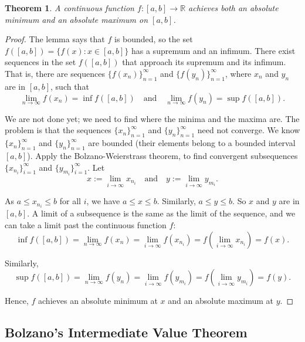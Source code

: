 \documentclass{article}
\newtheorem{theorem}{Theorem}[section]
\theoremstyle{definition}
\begin{document}
\begin{theorem}
    A continuous function \( f: [a, b] \rightarrow \mathbb{R} \) achieves both an absolute minimum and an absolute maximum on \([a, b]\).
\end{theorem}

\begin{proof}
    The lemma says that \( f \) is bounded, so the set \( f([a, b]) = \{ f(x) : x \in [a, b] \} \) has a supremum and an infimum. There exist sequences in the set \( f([a, b]) \) that approach its supremum and its infimum. That is, there are sequences \( \{ f(x_n) \}_{n=1}^{\infty} \) and \( \{ f(y_n) \}_{n=1}^{\infty} \), where \( x_n \) and \( y_n \) are in \( [a, b] \), such that
\[
\lim_{n \rightarrow \infty} f(x_n) = \inf f([a, b]) \quad \text{and} \quad \lim_{n \rightarrow \infty} f(y_n) = \sup f([a, b]).
\]

We are not done yet; we need to find where the minima and the maxima are. The problem is that the sequences \( \{ x_n \}_{n=1}^{\infty} \) and \( \{ y_n \}_{n=1}^{\infty} \) need not converge. We know \( \{ x_n \}_{n=1}^{\infty} \) and \( \{ y_n \}_{n=1}^{\infty} \) are bounded (their elements belong to a bounded interval \( [a, b] \)). Apply the Bolzano-Weierstrass theorem, to find convergent subsequences \( \{ x_{n_i} \}_{i=1}^{\infty} \) and \( \{ y_{m_i} \}_{i=1}^{\infty} \). Let
\[
x := \lim_{i \rightarrow \infty} x_{n_i} \quad \text{and} \quad y := \lim_{i \rightarrow \infty} y_{m_i}.
\]

As \( a \leq x_{n_i} \leq b \) for all \( i \), we have \( a \leq x \leq b \). Similarly, \( a \leq y \leq b \). So \( x \) and \( y \) are in \( [a, b] \). A limit of a subsequence is the same as the limit of the sequence, and we can take a limit past the continuous function \( f \):
\[
\inf f([a, b]) = \lim_{n \rightarrow \infty} f(x_n) = \lim_{i \rightarrow \infty} f(x_{n_i}) = f\left( \lim_{i \rightarrow \infty} x_{n_i} \right) = f(x).
\]

Similarly,
\[
\sup f([a, b]) = \lim_{n \rightarrow \infty} f(y_n) = \lim_{i \rightarrow \infty} f(y_{m_i}) = f\left( \lim_{i \rightarrow \infty} y_{m_i} \right) = f(y).
\]

Hence, \( f \) achieves an absolute minimum at \( x \) and an absolute maximum at \( y \).
\end{proof}


\subsection{Bolzano's Intermediate Value Theorem}
\end{document}
